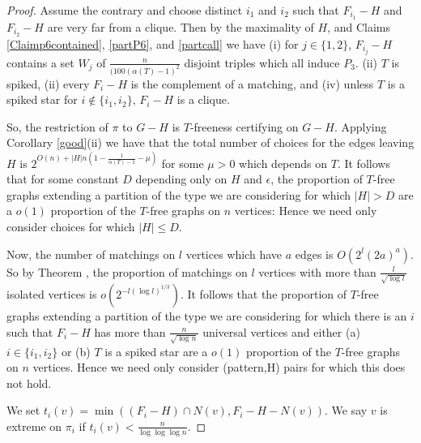 \documentclass[12pt]{article}
\theoremstyle{definition}
\begin{document}
 \begin{proof}
 Assume the contrary and choose distinct $i_1$ and $i_2$  such that $F_{i_1}-H$ and $F_{i_2}-H$ are very far from a clique. 
 Then by the maximality of $H$, and Claims \ref{Claimp6contained}, \ref{partP6}, and  \ref{partcall}  we have (i) 
 for $j \in \{1,2\}$, $F_{i_j}-H$ contains a set $W_j$ of $\frac{n}{(100(\alpha(T)-1)^2}$  disjoint triples which all induce $P_3$. (ii)  $T$ is spiked, (ii)  every $F_i-H$ is the complement of a matching, and (iv) unless $T$ is a spiked star for 
 $i \not \in \{i_1,i_2\}$, $F_i-H$ is a clique. 
 
 So, the restriction of $\pi$ to $G-H$ is  $T$-freeness certifying on $G-H$. 
 Applying Corollary \ref{good}(ii) we have that 
the total number of choices for the edges leaving $H$ is $2^{O(n)+|H|n(1-\frac{1}{\alpha(T)-1}-\mu)}$ for some $\mu>0$ which depends on $T$. 
It follows that for some constant $D$ depending only on $H$ and $\epsilon$, the proportion of $T$-free graphs extending a partition of the type we are considering for which
$|H|>D$ are   a $o(1)$ proportion of the $T$-free graphs on $n$ vertices: Hence we need only consider choices for which $|H| \le D$.

Now, the number   of matchings on $l$ vertices which have $a$ edges is $O(2^l(2a)^{a})$. 
So by Theorem \cite{K97}, the proportion  of matchings on $l$ vertices  with more than $\frac{l}{\sqrt{\log l}}$ isolated vertices
is $o(2^{-l (\log l)^{1/3}})$. It follows that  the proportion of $T$-free graphs extending a partition of the type we are considering for which there is an $i$ such that 
$F_{i}-H$  has more than $\frac{n}{\sqrt{\log n}}$ universal vertices and either (a) $i \in \{i_1,i_2\}$ or (b) $T$ is a spiked star are    a $o(1)$ proportion of the $T$-free graphs on $n$ vertices.  Hence we need only consider (pattern,H) pairs  for which this does not hold. 

We set $t_i(v)=\min((F_i-H) \cap N(v), F_i-H-N(v))$. We say $v$ is extreme on $\pi_i$ if $t_i(v)< \frac{n}{\log \log \log n}$. 


\end{proof}
\end{document}
